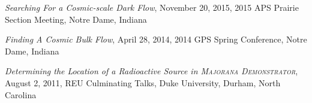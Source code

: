 \documentclass[margin]{res}
\begin{document}
\begin{resume}

\hangindent=15pt 
{\sl Searching For a Cosmic-scale Dark Flow}, November 20, 2015,
2015 APS Prairie Section Meeting, Notre Dame, Indiana
\vspace{-12pt}

\hangindent=15pt 
{\sl Finding A Cosmic Bulk Flow}, April 28, 2014, 2014 GPS Spring Conference, Notre Dame, Indiana
\vspace{-12pt}

\hangindent=15pt 
{\sl Determining the Location of a Radioactive Source in \textsc{Majorana Demonstrator}}, August 2, 2011, REU Culminating Talks, Duke University, Durham, North Carolina

\begin{comment}
{\sl Searching For a Cosmic-scale Dark Flow} \hfill {\bf November 20, 2015}\\
2015 APS Prairie Section Meeting, Notre Dame

{\sl Finding A Cosmic Bulk Flow} \hfill {\bf April 28, 2014}\\
2014 GPS Spring Conference, Notre Dame 

{\sl Determining the Location of a Radioactive Source in \textsc{Majorana}} \hfill {\bf August 2, 2011} \\
{\sl\textsc{Demonstrator}} \\
REU Culminating Talks,
Duke University %
\end{comment}








\end{resume}
\end{document}
